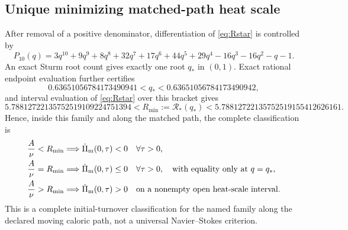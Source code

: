 \documentclass[11pt,a4paper]{article}
\begin{document}
\subsection{Unique minimizing matched-path heat scale}
After removal of a positive denominator, differentiation of \eqref{eq:Rstar} is controlled by
\begin{equation}
 P_{10}(q)=3q^{10}+9q^9+8q^8+32q^7+17q^6+44q^5+29q^4-16q^3-16q^2-q-1.
\end{equation}
An exact Sturm root count gives exactly one root $q_*$ in $(0,1)$. Exact rational endpoint evaluation further certifies
\begin{equation}
 0.63651056784173490941<q_*<0.63651056784173490942,
 \label{eq:qstarbracket}
\end{equation}
and interval evaluation of \eqref{eq:Rstar} over this bracket gives
\begin{equation}
 5.78812722135752519109224751394
 <R_{\min}:=\mathcal R_*(q_*)
 <5.78812722135752519155412626161.
 \label{eq:Rminbracket}
\end{equation}
Hence, inside this family and along the matched path, the complete classification is
\begin{align}
 \frac{A}{\nu}<R_{\min}
 &\Longrightarrow \dot\Pi_{\rm m}(0,\tau)<0\quad\forall\tau>0,\\
 \frac{A}{\nu}=R_{\min}
 &\Longrightarrow \dot\Pi_{\rm m}(0,\tau)\le0\quad\forall\tau>0,
 \quad\text{with equality only at }q=q_*,\\
 \frac{A}{\nu}>R_{\min}
 &\Longrightarrow \dot\Pi_{\rm m}(0,\tau)>0\quad\text{on a nonempty open heat-scale interval.}
\end{align}
This is a complete initial-turnover classification for the named family along the declared moving caloric path, not a universal Navier--Stokes criterion.
\end{document}
